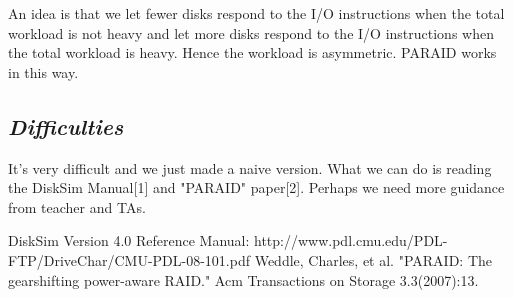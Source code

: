 \documentclass[conference]{IEEEtran}
\begin{document}
An idea is that we let fewer disks respond to the I/O instructions when the total workload is not heavy and let more disks respond to the I/O instructions when the total workload is heavy. Hence the workload is asymmetric. PARAID works in this way.\\
\subsection{\emph{\textbf{Difficulties}}}
It's very difficult and we just made a naive version. What we can do is reading the DiskSim Manual[1] and "PARAID" paper[2]. Perhaps we need more guidance from teacher and TAs.





%
%
%
\begin{thebibliography}{1}

    DiskSim Version 4.0 Reference Manual: http://www.pdl.cmu.edu/PDL-FTP/DriveChar/CMU-PDL-08-101.pdf
	Weddle, Charles, et al. "PARAID: The gearshifting power-aware RAID." Acm Transactions on Storage 3.3(2007):13.
\end{thebibliography}




\end{document}
